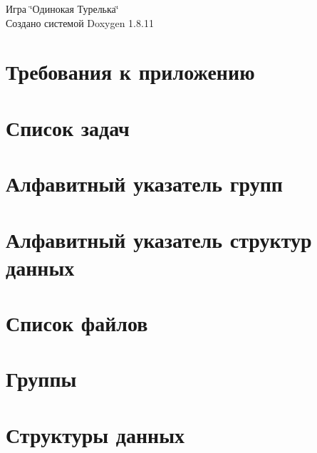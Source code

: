 \documentclass[twoside]{book}
\newcommand{\+}{\discretionary{\mbox{\scriptsize$\hookleftarrow$}}{}{}}
\newcommand{\clearemptydoublepage}{%
  \newpage{\pagestyle{empty}\cleardoublepage}%
}
\begin{document}
\hypersetup{pageanchor=false,
             bookmarksnumbered=true,
             pdfencoding=unicode
            }
\begin{titlepage}
\vspace*{7cm}
\begin{center}%
{\Large Игра \char`\"{}Одинокая Турелька\char`\"{} }\\
\vspace*{1cm}
{\large Создано системой Doxygen 1.8.11}\\
\end{center}
\end{titlepage}
\clearemptydoublepage
\tableofcontents
\clearemptydoublepage
{}
\hypersetup{pageanchor=true}

\chapter{Требования к приложению}
\label{index}\hypertarget{index}{}
\chapter{Список задач}
\label{todo}
\hypertarget{todo}{}

\chapter{Алфавитный указатель групп}

\chapter{Алфавитный указатель структур данных}

\chapter{Список файлов}

\chapter{Группы}






\chapter{Структуры данных}



















\end{document}

